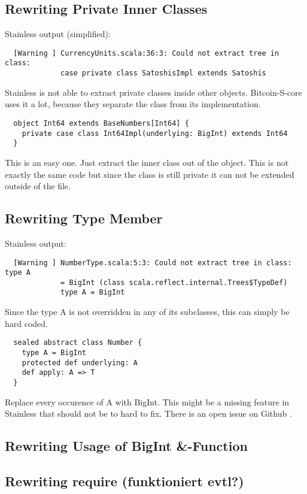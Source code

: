 \subsection{Rewriting Private Inner Classes}
Stainless output (simplified):
\begin{lstlisting}
  [Warning ] CurrencyUnits.scala:36:3: Could not extract tree in class:
             case private class SatoshisImpl extends Satoshis
\end{lstlisting}
Stainless is not able to extract private classes inside other objects.
Bitcoin-S-core uses it a lot, because they separate the class from its implementation.
\begin{lstlisting}
  object Int64 extends BaseNumbers[Int64] {
    private case class Int64Impl(underlying: BigInt) extends Int64 
  }
\end{lstlisting}
This is an easy one.
Just extract the inner class out of the object.
This is not exactly the same code but since the class is still private it can not be extended outside of the file.

\subsection{Rewriting Type Member}
Stainless output:
\begin{lstlisting}
  [Warning ] NumberType.scala:5:3: Could not extract tree in class: type A
             = BigInt (class scala.reflect.internal.Trees$TypeDef)
             type A = BigInt
\end{lstlisting}
Since the type A is not overridden in any of its subclasses, this can simply be hard coded.
\begin{lstlisting}
  sealed abstract class Number {
    type A = BigInt
    protected def underlying: A
    def apply: A => T
  }
\end{lstlisting}
Replace every occurence of A with BigInt.
This might be a missing feature in Stainless that should not be to hard to fix.
There is an open issue on Github .

\subsection{Rewriting Usage of BigInt \&-Function}

\subsection{Rewriting require (funktioniert evtl?)}
